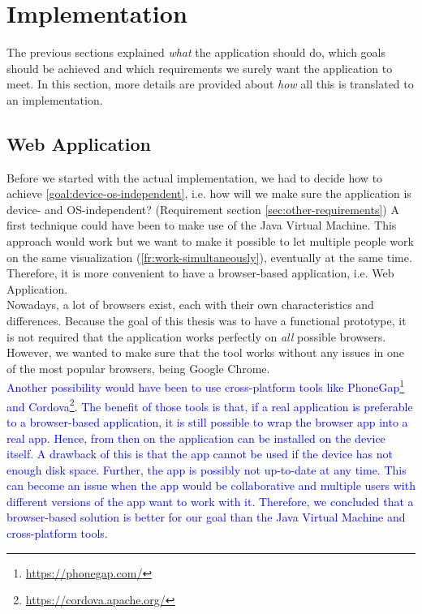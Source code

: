 \chapter{Implementation}\label{ch:implementation}

The previous sections explained \textit{what} the application should do, which goals should be achieved and which requirements we surely want the application to meet. In this section, more details are provided about \textit{how} all this is translated to an implementation.

\section{Web Application}
Before we started with the actual implementation, we had to decide how to achieve \ref{goal:device-os-independent}, i.e. how will we make sure the application is device- and OS-independent? (Requirement section \ref{sec:other-requirements}) A first technique could have been to make use of the Java Virtual Machine. This approach would work but we want to make it possible to let multiple people work on the same visualization (\ref{fr:work-simultaneously}), eventually at the same time. Therefore, it is more convenient to have a browser-based application, i.e. Web Application.\\

Nowadays, a lot of browsers exist, each with their own characteristics and differences. Because the goal of this thesis was to have a functional prototype, it is not required that the application works perfectly on \textit{all} possible browsers. However, we wanted to make sure that the tool works without any issues in one of the most popular browsers, being Google Chrome.\\

\textcolor{blue}{
Another possibility would have been to use cross-platform tools like PhoneGap\footnote{\url{https://phonegap.com/}} and Cordova\footnote{\url{https://cordova.apache.org/}}. The benefit of those tools is that, if a real application is preferable to a browser-based application, it is still possible to wrap the browser app into a real app. Hence, from then on the application can be installed on the device itself. A drawback of this is that the app cannot be used if the device has not enough disk space. Further, the app is possibly not up-to-date at any time. This can become an issue when the app would be collaborative and multiple users with different versions of the app want to work with it. Therefore, we concluded that a browser-based solution is better for our goal than the Java Virtual Machine and cross-platform tools.
}

